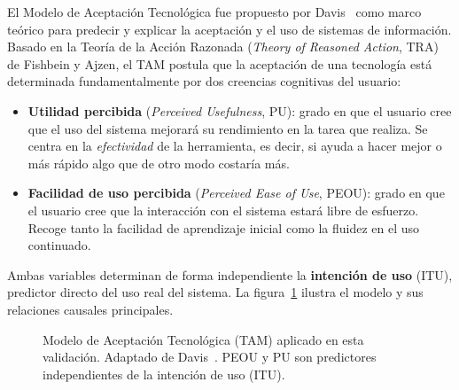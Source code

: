 El Modelo de Aceptación Tecnológica fue propuesto por Davis~\cite{davis1989tam} como marco teórico para predecir y explicar la aceptación y el uso de sistemas de información. Basado en la Teoría de la Acción Razonada (\textit{Theory of Reasoned Action}, TRA) de Fishbein y Ajzen, el TAM postula que la aceptación de una tecnología está determinada fundamentalmente por dos creencias cognitivas del usuario:

\begin{itemize}
  \item \textbf{Utilidad percibida} (\textit{Perceived Usefulness}, PU): grado en que el usuario cree que el uso del sistema mejorará su rendimiento en la tarea que realiza. Se centra en la \textit{efectividad} de la herramienta, es decir, si ayuda a hacer mejor o más rápido algo que de otro modo costaría más.

  \item \textbf{Facilidad de uso percibida} (\textit{Perceived Ease of Use}, PEOU): grado en que el usuario cree que la interacción con el sistema estará libre de esfuerzo. Recoge tanto la facilidad de aprendizaje inicial como la fluidez en el uso continuado.
\end{itemize}

Ambas variables determinan de forma independiente la \textbf{intención de uso} (ITU), predictor directo del uso real del sistema. La figura~\ref{fig:tamModelo} ilustra el modelo y sus relaciones causales principales.

\begin{figure}[ht]
\centering
{}
\caption{Modelo de Aceptación Tecnológica (TAM) aplicado en esta validación. Adaptado de Davis~\cite{davis1989tam}. PEOU y PU son predictores independientes de la intención de uso (ITU).}
\label{fig:tamModelo}
\end{figure}

